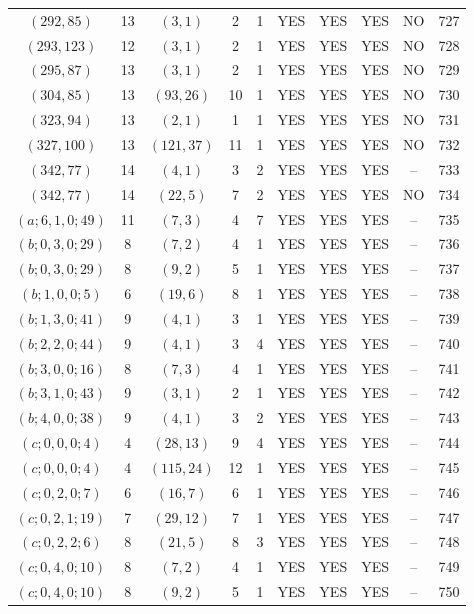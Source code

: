 \begin{longtable}{|c|c|c|c|c|c|c|c|c|c|}
$(292, 85)$ & 13 & $(3, 1)$ & 2 & 1 & YES & YES & YES & NO & 727\\
$(293, 123)$ & 12 & $(3, 1)$ & 2 & 1 & YES & YES & YES & NO & 728\\
$(295, 87)$ & 13 & $(3, 1)$ & 2 & 1 & YES & YES & YES & NO & 729\\
$(304, 85)$ & 13 & $(93, 26)$ & 10 & 1 & YES & YES & YES & NO & 730\\
$(323, 94)$ & 13 & $(2, 1)$ & 1 & 1 & YES & YES & YES & NO & 731\\
$(327, 100)$ & 13 & $(121, 37)$ & 11 & 1 & YES & YES & YES & NO & 732\\
$(342, 77)$ & 14 & $(4, 1)$ & 3 & 2 & YES & YES & YES & -- & 733\\
$(342, 77)$ & 14 & $(22, 5)$ & 7 & 2 & YES & YES & YES & NO & 734\\
$(a; 6, 1, 0; 49)$ & 11 & $(7, 3)$ & 4 & 7 & YES & YES & YES & -- & 735\\
$(b; 0, 3, 0; 29)$ & 8 & $(7, 2)$ & 4 & 1 & YES & YES & YES & -- & 736\\
$(b; 0, 3, 0; 29)$ & 8 & $(9, 2)$ & 5 & 1 & YES & YES & YES & -- & 737\\
$(b; 1, 0, 0; 5)$ & 6 & $(19, 6)$ & 8 & 1 & YES & YES & YES & -- & 738\\
$(b; 1, 3, 0; 41)$ & 9 & $(4, 1)$ & 3 & 1 & YES & YES & YES & -- & 739\\
$(b; 2, 2, 0; 44)$ & 9 & $(4, 1)$ & 3 & 4 & YES & YES & YES & -- & 740\\
$(b; 3, 0, 0; 16)$ & 8 & $(7, 3)$ & 4 & 1 & YES & YES & YES & -- & 741\\
$(b; 3, 1, 0; 43)$ & 9 & $(3, 1)$ & 2 & 1 & YES & YES & YES & -- & 742\\
$(b; 4, 0, 0; 38)$ & 9 & $(4, 1)$ & 3 & 2 & YES & YES & YES & -- & 743\\
$(c; 0, 0, 0; 4)$ & 4 & $(28, 13)$ & 9 & 4 & YES & YES & YES & -- & 744\\
$(c; 0, 0, 0; 4)$ & 4 & $(115, 24)$ & 12 & 1 & YES & YES & YES & -- & 745\\
$(c; 0, 2, 0; 7)$ & 6 & $(16, 7)$ & 6 & 1 & YES & YES & YES & -- & 746\\
$(c; 0, 2, 1; 19)$ & 7 & $(29, 12)$ & 7 & 1 & YES & YES & YES & -- & 747\\
$(c; 0, 2, 2; 6)$ & 8 & $(21, 5)$ & 8 & 3 & YES & YES & YES & -- & 748\\
$(c; 0, 4, 0; 10)$ & 8 & $(7, 2)$ & 4 & 1 & YES & YES & YES & -- & 749\\
$(c; 0, 4, 0; 10)$ & 8 & $(9, 2)$ & 5 & 1 & YES & YES & YES & -- & 750\\

\end{longtable}
